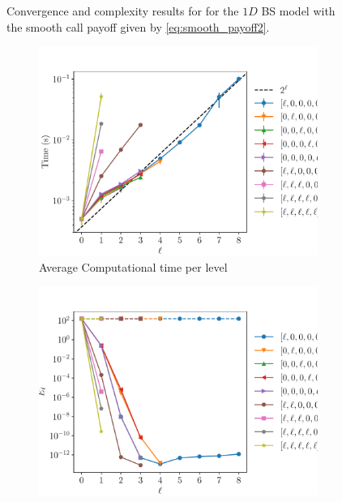\documentclass[11pt]{article}
\begin{document}
\begin{figure}[!h]
\begin{subfigure}{.5\textwidth}
		\caption{}
		\label{fig:misc_1D_BS_16_steps_smooth_second_payoff_eps_10_5_sub2}
	\end{subfigure}%
	\caption{Convergence and complexity results for for the $1D$ BS model with the smooth call payoff given by \eqref{eq:smooth_payoff2}.}
	\label{fig:misc_1D_BS_16_steps_smooth_second_payoff_eps_10_5_1}
\end{figure}



\begin{figure}[!h]
	\centering
	\begin{subfigure}{.5\textwidth}
		\centering
		\includegraphics[width=0.95\linewidth]{./figures/1D_BS_16_steps_smooth_second_payoff_eps_10_5/level_work.pdf}
		\caption{Average Computational time per level}
		\label{fig:misc_1D_BS_16_steps_smooth_second_payoff_eps_10_5_sub3}
	\end{subfigure}%
	\begin{subfigure}{.5\textwidth}
		\centering
		\includegraphics[width=0.95\linewidth]{./figures/1D_BS_16_steps_smooth_second_payoff_eps_10_5/levels_error_rate.pdf}

\end{subfigure}
\end{figure}
\end{document}
